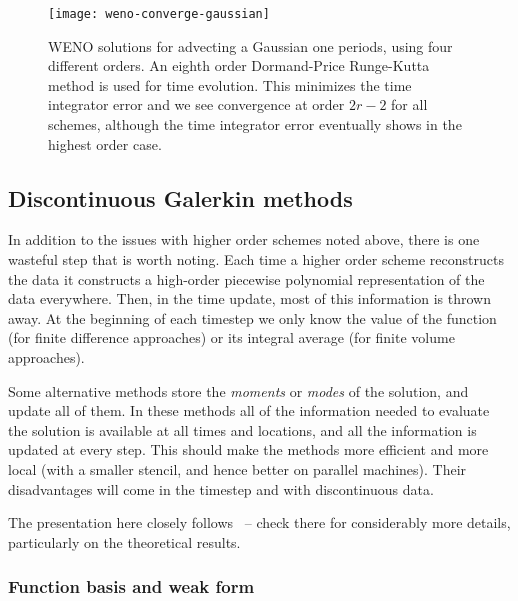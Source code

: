 \begin{figure}[t]
\centering
\texttt{[image: weno-converge-gaussian]}
\caption[Very high order WENO convergence rates for linear advection]
{\label{fig:weno-converge-gaussian} WENO solutions for advecting a Gaussian one periods, using four different orders. An eighth order Dormand-Price Runge-Kutta method is used for time evolution. This minimizes the time integrator error and we see convergence at order $2 r - 2$ for all schemes, although the time integrator error eventually shows in the highest order case. \\
}
\end{figure}
%

\subsection{Discontinuous Galerkin methods}
\label{sec:dg}

In addition to the issues with higher order schemes noted above, there is one
wasteful step that is worth noting. Each time a higher order scheme reconstructs
the data it constructs a high-order piecewise polynomial representation of the
data everywhere. Then, in the time update, most of this information is thrown
away. At the beginning of each timestep we only know the value of the function
(for finite difference approaches) or its integral average (for finite volume
approaches).

Some alternative methods store the \emph{moments} or \emph{modes} of the
solution, and update all of them. In these methods all of the information
needed to evaluate the solution is available at all times and locations, and
all the information is updated at every step. This should make the methods more
efficient and more local (with a smaller stencil, and hence better on parallel
machines). Their disadvantages will come in the timestep and with discontinuous
data.

The presentation here closely follows~\cite{hesthaven2018numerical} -- check
there for considerably more details, particularly on the theoretical results.

\subsubsection{Function basis and weak form}
\label{sec:dg_basis}

